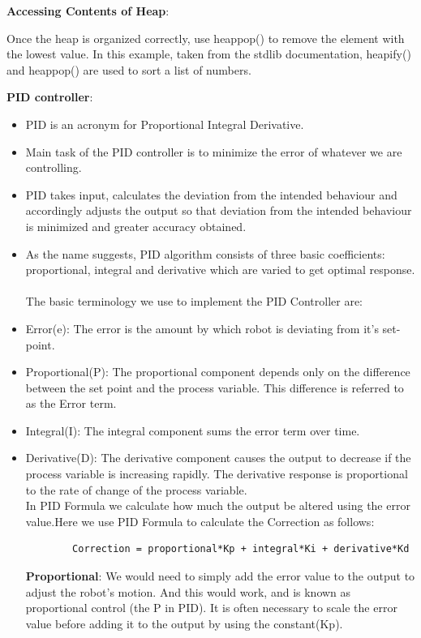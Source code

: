 \documentclass[report]{res}
\begin{document}
	\textbf{Accessing Contents of Heap}:
	
	Once the heap is organized correctly, use heappop() to remove the element with the lowest value. In this example, taken from the stdlib documentation, heapify() and heappop() are used to sort a list of numbers.
	
	\textbf{PID controller}:
	
	\begin{itemize}
	
	\item	PID is an acronym for Proportional Integral Derivative.
	\item	Main task of the PID controller is to minimize the error of whatever we are controlling.
	\item	PID takes input, calculates the deviation from the intended behaviour and accordingly adjusts the output so that deviation from the intended behaviour is minimized and greater accuracy obtained.
	\item	As the name suggests, PID algorithm consists of three basic coefficients: proportional, integral and derivative which are varied to get optimal response. 
	\\ \\The basic terminology we use to implement the PID Controller are:
	\item	Error(e): The error is the amount by which robot is deviating from it’s set-point.
	\item	Proportional(P): The proportional component depends only on the difference between the set point and the process variable. This difference is referred to as the Error term.
	\item	Integral(I): The integral component sums the error term over time.
	\item	Derivative(D): The derivative component causes the output to decrease if the process variable is increasing rapidly. The derivative response is proportional to the rate of change of the process variable.
	\\
	In PID Formula we calculate how much the output be altered using the error value.Here we use PID Formula to calculate the Correction as follows:
	
	\begin{lstlisting}
    	Correction = proportional*Kp + integral*Ki + derivative*Kd
	\end{lstlisting}
	
	\textbf{Proportional}: We would need to simply add the error value to the output to adjust the robot’s motion. And this would work, and is known as proportional control (the P in PID). It is often necessary to scale the error value before adding it to the output by using the constant(Kp).
	

\end{itemize}
\end{document}
